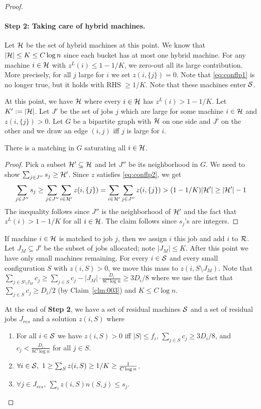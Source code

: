\begin{proof}
\paragraph{Step 2: Taking care of hybrid machines.} 
Let ${\cal H}$ be the set of hybrid machines at this point. We know that $|{\cal H}| \leq K \leq C\log n$ since each bucket has at most one hybrid machine.
For any machine $i\in {\cal H}$ with $z^L(i) \le 1-1/K$, we zero-out all its large contribution. More precisely, for all $j$ large for $i$ we set $z(i,\{j\})= 0$.
Note that \eqref{eq:conflp1} is no longer true, but it holds with RHS $\geq 1/K$. Note that these machines enter ${\cal S}$.

At this point, we have ${\cal H}$ where every $i\in {\cal H}$ has $z^L(i) > 1-1/K$. Let $K' := |{\cal H}|$. Let $J'$ be the set of jobs $j$ which are large for some machine $i\in {\cal H}$ and $z(i,\{j\}) > 0$.
Let $G$ be a bipartite graph with ${\cal H}$ on one side and $J'$ on the other and we draw an edge $(i,j)$ iff $j$ is large for $i$.
\begin{claim}
	There is a matching in $G$ saturating all $i\in {\cal H}$.
\end{claim}
\begin{proof}
Pick a subset ${\cal H}' \subseteq {\cal H}$ and let $J''$ be its neighborhood in $G$. We need to show $\sum_{j\in J''} s_j \geq {\cal H}'$.
Since $z$ satisfies \eqref{eq:conflp2}, we get
\[
\sum_{j\in J''} s_j \geq \sum_{j\in J''} \sum_{i\in {\cal H}'} z(i,\{j\}) = \sum_{i\in {\cal H}'} \sum_{j\in J''} z(i,\{j\})  > (1-1/K)|{\cal H}'| \geq |{\cal H}'| - 1
\]
The inequality follows since $J''$ is the neighborhood of ${\cal H}'$ and the fact that $z^L(i) > 1-1/K$ for all $i\in {\cal H}$.
The claim follows since $s_j$'s are integers.
\end{proof}
If machine $i\in {\cal H}$ is matched to job $j$, then we assign $i$ this job and add $i$ to ${\cal R}$. Let $J_M \subseteq J'$ be the subset of jobs allocated; note $|J_M| \leq K$.
After this point we have only small machines remaining. For every $i\in {\cal S}$ and every small configuration $S$ with $z(i,S) > 0$, we move this mass to $z(i,S\setminus J_M)$.
Note that $\sum_{j\in S\setminus J_M} c_j \geq  \sum_{j\in S} c_j - |J_M|\cdot \frac{D_i}{8C\log n} \geq 3D_i/8$ where we use the fact that $\sum_{j\in S} c_j \geq D_i/2$ (by Claim~\ref{clm:003}) and $K\leq C\log n$.


\begin{claim}\label{clm:007}
At the end of {\bf  Step 2}, we have a set of residual machines ${\cal S}$ and a set of residual jobs $J_{res}$  and a solution $z(i,S)$ where 
\begin{enumerate} [noitemsep]
	\item For all $i\in {\cal S}$ we have $z(i,S) > 0$ iff $|S| \leq f_i$, $\sum_{j\in S} c_j \geq 3D_i/8$, and $c_j < \frac{D_i}{8C\log n}$ for all $j\in S$.
	\item $\forall i \in {\cal S}, ~ \textstyle 1 \ge \sum_{S} z(i,S)  \geq   1/K \geq \frac{1}{C\log n}$.
	\item $\forall j\in J_{res}, ~ \textstyle \sum_{i} z(i,S)n(S,j)  \leq  s_j$.
	

\end{enumerate}
\end{claim}
\end{proof}
